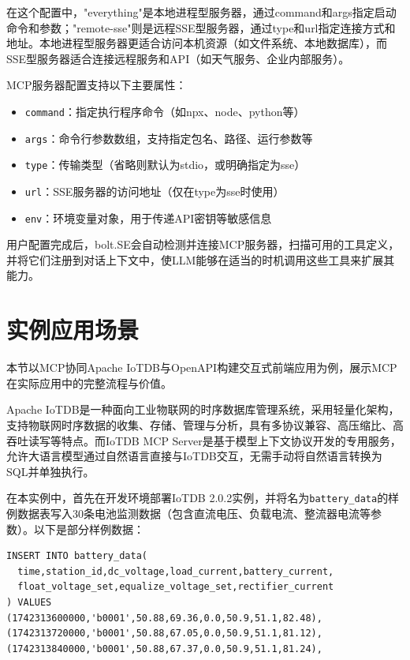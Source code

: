 在这个配置中，"everything"是本地进程型服务器，通过command和args指定启动命令和参数；"remote-sse"则是远程SSE型服务器，通过type和url指定连接方式和地址。本地进程型服务器更适合访问本机资源（如文件系统、本地数据库），而SSE型服务器适合连接远程服务和API（如天气服务、企业内部服务）。

MCP服务器配置支持以下主要属性：
\begin{itemize}
  \item \texttt{command}：指定执行程序命令（如npx、node、python等）
  \item \texttt{args}：命令行参数数组，支持指定包名、路径、运行参数等
  \item \texttt{type}：传输类型（省略则默认为stdio，或明确指定为sse）
  \item \texttt{url}：SSE服务器的访问地址（仅在type为sse时使用）
  \item \texttt{env}：环境变量对象，用于传递API密钥等敏感信息
\end{itemize}

用户配置完成后，bolt.SE会自动检测并连接MCP服务器，扫描可用的工具定义，并将它们注册到对话上下文中，使LLM能够在适当的时机调用这些工具来扩展其能力。

\section{实例应用场景}
\label{sec:mcp-iotdb-demo}

本节以MCP协同Apache IoTDB与OpenAPI构建交互式前端应用为例，展示MCP在实际应用中的完整流程与价值。

Apache IoTDB是一种面向工业物联网的时序数据库管理系统，采用轻量化架构，支持物联网时序数据的收集、存储、管理与分析，具有多协议兼容、高压缩比、高吞吐读写等特点\cite{ApacheIoTDB2025}。而IoTDB MCP Server是基于模型上下文协议开发的专用服务，允许大语言模型通过自然语言直接与IoTDB交互，无需手动将自然语言转换为SQL并单独执行\cite{IoTDBMCP2025}。

在本实例中，首先在开发环境部署IoTDB 2.0.2实例，并将名为\texttt{battery\_data}的样例数据表写入30条电池监测数据（包含直流电压、负载电流、整流器电流等参数）。以下是部分样例数据：

\begin{verbatim}
INSERT INTO battery_data(
  time,station_id,dc_voltage,load_current,battery_current, 
  float_voltage_set,equalize_voltage_set,rectifier_current
) VALUES
(1742313600000,'b0001',50.88,69.36,0.0,50.9,51.1,82.48),
(1742313720000,'b0001',50.88,67.05,0.0,50.9,51.1,81.12),
(1742313840000,'b0001',50.88,67.37,0.0,50.9,51.1,81.24),
\end{verbatim}


